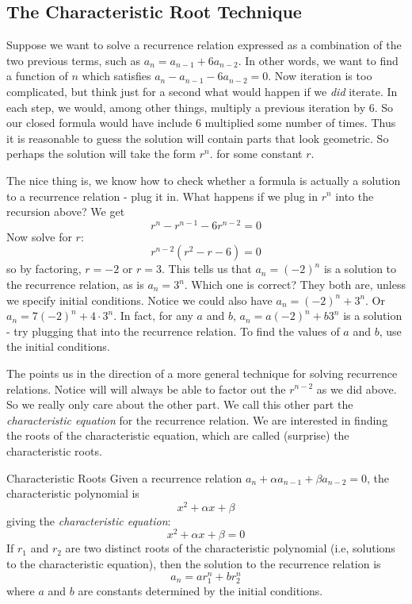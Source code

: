 \documentclass[12pt]{article}
\begin{document}
\subsection{The Characteristic Root Technique}

Suppose we want to solve a recurrence relation expressed as a combination of the two previous terms, such as $a_n = a_{n-1} + 6a_{n-2}$. In other words, we want to find a function of $n$ which satisfies $a_n - a_{n-1} - 6a_{n-2} = 0$.  Now iteration is too complicated, but think just for a second what would happen if we {\em did} iterate.  In each step, we would, among other things, multiply a previous iteration by 6.   So our closed formula would have include $6$ multiplied some number of times.  Thus it is reasonable to guess the solution will contain parts that look geometric.  So perhaps the solution will take the form $r^n$. for some constant $r$.
 
The nice thing is, we know how to check whether a formula is actually a solution to a recurrence relation - plug it in.  What happens if we plug in $r^n$ into the recursion above? We get  \[r^n - r^{n-1} - 6r^{n-2} = 0\]  Now solve for $r$: \[r^{n-2}(r^2 - r - 6) = 0\]
so by factoring, $r = -2$ or $r = 3$.  This tells us that $a_n = (-2)^n$ is a solution to the recurrence relation, as is $a_n = 3^n$.  Which one is correct?  They both are, unless we specify initial conditions.  Notice we could also have $a_n = (-2)^n + 3^n$.  Or $a_n = 7(-2)^n + 4\cdot 3^n$.  In fact, for any $a$ and $b$, $a_n = a(-2)^n + b 3^n$ is a solution - try plugging that into the recurrence relation.  To find the values of $a$ and $b$, use the initial conditions.
 
The points us in the direction of a more general technique for solving recurrence relations.  Notice will will always be able to factor out the $r^{n-2}$ as we did above.  So we really only care about the other part.  We call this other part the {\em characteristic equation} for the recurrence relation.  We are interested in finding the roots of the characteristic equation, which are called (surprise) the characteristic roots.  

\begin{defbox}{Characteristic Roots}
 Given a recurrence relation $a_n + \alpha a_{n-1} + \beta a_{n-2} = 0$, the characteristic polynomial is
 \[x^2 + \alpha x + \beta\]
 giving the {\em characteristic equation}:
 \[x^2 + \alpha x + \beta = 0\]
 If $r_1$ and $r_2$ are two distinct roots of the characteristic polynomial (i.e, solutions to the characteristic equation), then the solution to the recurrence relation is
 \[a_n = ar_1^n + br_2^n\]
 where $a$ and $b$ are constants determined by the initial conditions.
\end{defbox}
\end{document}
